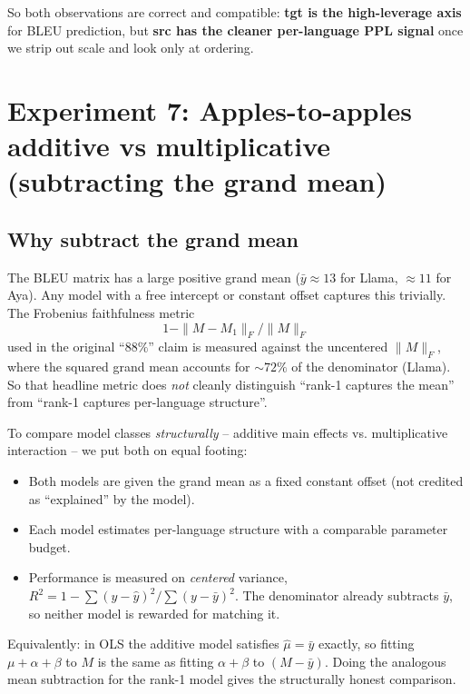 \documentclass[11pt]{article}
\begin{document}
So both observations are correct and compatible: \textbf{tgt is the
high-leverage axis} for BLEU prediction, but \textbf{src has the cleaner
per-language PPL signal} once we strip out scale and look only at ordering.

\section{Experiment 7: Apples-to-apples additive vs multiplicative
(subtracting the grand mean)}
\label{sec:structural}

\subsection{Why subtract the grand mean}

The BLEU matrix has a large positive grand mean ($\bar y \approx 13$ for
Llama, $\approx 11$ for Aya). Any model with a free intercept or constant
offset captures this trivially. The Frobenius faithfulness metric
\[
1 - \|M - M_1\|_F / \|M\|_F
\]
used in the original ``$88\%$'' claim is measured against the uncentered
$\|M\|_F$, where the squared grand mean accounts for $\sim 72\%$ of the
denominator (Llama). So that headline metric does \emph{not} cleanly
distinguish ``rank-1 captures the mean'' from ``rank-1 captures
per-language structure''.

To compare model classes \emph{structurally} -- additive main effects vs.
multiplicative interaction -- we put both on equal footing:

\begin{itemize}
  \item Both models are given the grand mean as a fixed constant offset
    (not credited as ``explained'' by the model).
  \item Each model estimates per-language structure with a comparable
    parameter budget.
  \item Performance is measured on \emph{centered} variance,
    $R^2 = 1 - \sum(y - \hat y)^2 / \sum(y - \bar y)^2$. The denominator
    already subtracts $\bar y$, so neither model is rewarded for matching it.
\end{itemize}

Equivalently: in OLS the additive model satisfies $\hat\mu = \bar y$
exactly, so fitting $\mu + \alpha + \beta$ to $M$ is the same as fitting
$\alpha + \beta$ to $(M - \bar y)$. Doing the analogous mean subtraction
for the rank-1 model gives the structurally honest comparison.
\end{document}
